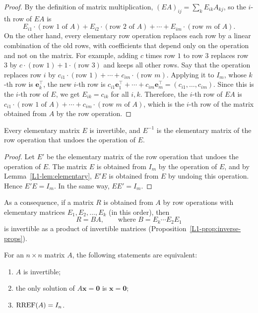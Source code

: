 \begin{proof}
    By the definition of matrix multiplication, $(EA)_{ij} = \sum_k E_{ik} A_{kj}$, so the $i$-th row of $EA$ is
    \[E_{i1} \cdot (\text{row } 1 \text{ of } A) + E_{i2} \cdot (\text{row } 2 \text{ of } A) + \cdots + E_{im} \cdot (\text{row } m \text{ of } A).\]
    On the other hand, every elementary row operation replaces each row by a linear combination of the old rows, with coefficients that depend only on the operation and not on the matrix. For example, adding $c$ times row $1$ to row $3$ replaces row $3$ by $c \cdot (\text{row } 1) + 1 \cdot (\text{row } 3)$ and keeps all other rows. Say that the operation replaces row $i$ by $c_{i1} \cdot (\text{row } 1) + \cdots + c_{im} \cdot (\text{row } m)$. Applying it to $I_m$, whose $k$-th row is $\mathbf{e}_k^\top$, the new $i$-th row is $c_{i1} \mathbf{e}_1^\top + \cdots + c_{im} \mathbf{e}_m^\top = (c_{i1}, \ldots, c_{im})$. Since this is the $i$-th row of $E$, we get $E_{ik} = c_{ik}$ for all $i, k$. Therefore, the $i$-th row of $EA$ is $c_{i1} \cdot (\text{row } 1 \text{ of } A) + \cdots + c_{im} \cdot (\text{row } m \text{ of } A)$, which is the $i$-th row of the matrix obtained from $A$ by the row operation.
\end{proof}

\begin{lemma}\label{L1-lem:elem-inv}
    Every elementary matrix $E$ is invertible, and $E^{-1}$ is the elementary matrix of the row operation that undoes the operation of $E$.
\end{lemma}

\begin{proof}
    Let $E'$ be the elementary matrix of the row operation that undoes the operation of $E$. The matrix $E$ is obtained from $I_m$ by the operation of $E$, and by Lemma~\ref{L1-lem:elementary}, $E'E$ is obtained from $E$ by undoing this operation. Hence $E'E = I_m$. In the same way, $EE' = I_m$.
\end{proof}

As a consequence, if a matrix $R$ is obtained from $A$ by row operations with elementary matrices $E_1, E_2, \ldots, E_k$ (in this order), then
\[R = BA, \qquad \text{where } B = E_k \cdots E_2 E_1\]
is invertible as a product of invertible matrices (Proposition~\ref{L1-prop:inverse-props}).

\begin{theorem}\label{L1-thm:invertible}
    For an $n \times n$ matrix $A$, the following statements are equivalent:
    \begin{enumerate}
        \item $A$ is invertible;
        \item the only solution of $A\mathbf{x} = \mathbf{0}$ is $\mathbf{x} = \mathbf{0}$;
        \item $\operatorname{RREF}(A) = I_n$.
    \end{enumerate}
\end{theorem}

